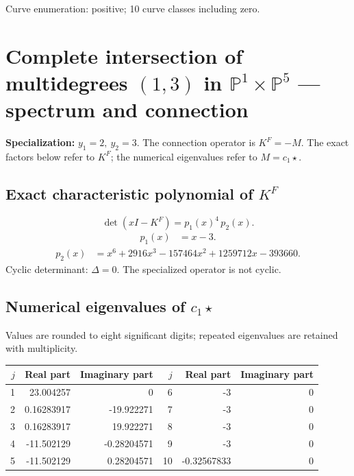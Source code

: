 \documentclass[10pt,a4paper]{article}
\begin{document}
Curve enumeration: positive; 10 curve classes including zero.
\clearpage\section*{Complete intersection of multidegrees $(1,3)$ in $\mathbb P^{1}\times \mathbb P^{5}$ --- spectrum and connection}
\textbf{Specialization:} $y_1=2,\ y_2=3$. The connection operator is $K^F=-M$. The exact factors below refer to $K^F$; the numerical eigenvalues refer to $M=c_1\star$.
\subsection*{Exact characteristic polynomial of $K^F$}
\[\det(xI-K^F)=p_{1}(x)^{4}\,p_{2}(x).\]
\[\begin{aligned}p_{1}(x)&=x - 3.\end{aligned}\]
\[\begin{aligned}p_{2}(x)&=x^{6} + 2916 x^{3} - 157464 x^{2} + 1259712 x - 393660.\end{aligned}\]
Cyclic determinant: $\Delta=0$. The specialized operator is not cyclic.
\subsection*{Numerical eigenvalues of $c_1\star$}
Values are rounded to eight significant digits; repeated eigenvalues are retained with multiplicity.
\begin{center}\small\begin{tabular}{rrr@{\qquad}rrr}\toprule $j$ & Real part & Imaginary part & $j$ & Real part & Imaginary part\\\midrule
1 & 23.004257 & 0 & 6 & -3 & 0\\
2 & 0.16283917 & -19.922271 & 7 & -3 & 0\\
3 & 0.16283917 & 19.922271 & 8 & -3 & 0\\
4 & -11.502129 & -0.28204571 & 9 & -3 & 0\\
5 & -11.502129 & 0.28204571 & 10 & -0.32567833 & 0\\
\bottomrule\end{tabular}\end{center}
\end{document}
